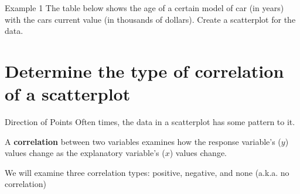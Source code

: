 \documentclass[t]{beamer}
\begin{document}
\begin{frame}{Example 1}
The table below shows the age of a certain model of car (in years) with the cars current value (in thousands of dollars). Create a scatterplot for the data.	\newline\\
\begin{minipage}{0.3\textwidth}
\end{minipage}
\hspace{0.25cm}
\end{frame}

\section{Determine the type of correlation of a scatterplot}

\begin{frame}{Direction of Points}
Often times, the data in a scatterplot has some pattern to it. \newline\\	\pause

\begin{tcolorbox}[colframe=green!20!black, colback = green!30!white,title=\textbf{Correlation}]
A \textbf{correlation} between two variables examines how the response variable's ($y$) values change as the explanatory variable's ($x$) values change.
\end{tcolorbox}
\bigskip \pause

We will examine three correlation types: positive, negative, and none (a.k.a. no correlation)
\end{frame}
\end{document}
